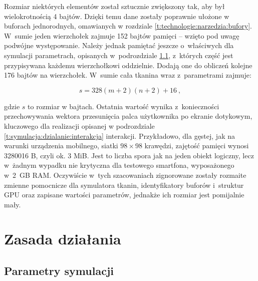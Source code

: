 	Rozmiar niektórych elementów został sztucznie zwiększony tak, aby był wielokrotnością 4 bajtów. Dzięki temu dane zostały poprawnie ułożone w buforach jednorodnych, omawianych w rozdziale \ref{t:technologie:narzedzia:bufory}. W~sumie jeden wierzchołek zajmuje 152 bajtów pamięci -- wzięto pod uwagę podwójne występowanie. Należy jednak pamiętać jeszcze o~właściwych dla symulacji parametrach, opisanych w~podrozdziale \ref{t:symulacja:dzialanie:parametry}, z~których część jest przypisywana każdemu wierzchołkowi oddzielnie. Dodają one do obliczeń kolejne 176 bajtów na wierzchołek. W~sumie cała tkanina wraz z~parametrami zajmuje:
	
	\begin{equation}
	s = 328(m + 2)(n + 2) + 16 \ ,
	\end{equation} 
	
	gdzie \(s\) to rozmiar w bajtach. Ostatnia wartość wynika z~konieczności przechowywania wektora przesunięcia palca użytkownika po ekranie dotykowym, kluczowego dla realizacji opisanej w podrozdziale \ref{t:symulacja:dzialanie:interakcja} interakcji. Przykładowo, dla gęstej, jak na warunki urządzenia mobilnego, siatki \( 98 \times 98 \) krawędzi, zajętość pamięci wynosi 3280016 B, czyli ok. 3 MiB. Jest to liczba spora jak na jeden obiekt logiczny, lecz w~żadnym wypadku nie krytyczna dla testowego smartfona, wyposażonego w~2~GB RAM. Oczywiście w~tych szacowaniach zignorowane zostały rozmaite zmienne pomocnicze dla symulatora tkanin, identyfikatory buforów i~struktur GPU oraz zapisane wartości parametrów, jednakże ich rozmiar jest pomijalnie mały.
	
	\section{Zasada działania}
	\label{t:symulacja:dzialanie}
	
			
			\subsection{Parametry symulacji}
			\label{t:symulacja:dzialanie:parametry}
			
			
